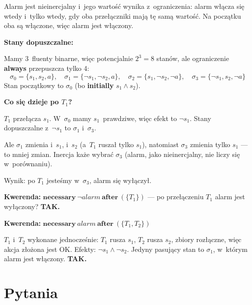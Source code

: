 \documentclass[11pt,a4paper]{article}
\newcommand{\aft}{\textbf{after}}
\newcommand{\initially}{\textbf{initially}}
\newcommand{\always}{\textbf{always}}
\newcommand{\necessary}{\textbf{necessary}}
\begin{document}
Alarm jest nieinercjalny i~jego wartość wynika z~ograniczenia: alarm włącza się
wtedy i~tylko wtedy, gdy oba przełączniki mają tę samą wartość.
Na początku oba są włączone, więc alarm jest włączony.

\medskip
\noindent\textbf{Stany dopuszczalne:}

Mamy 3~fluenty binarne, więc potencjalnie $2^3 = 8$ stanów,
ale ograniczenie \always{} przepuszcza tylko 4:
\[
  \sigma_0 = \{s_1, s_2, a\}, \quad
  \sigma_1 = \{\neg s_1, \neg s_2, a\}, \quad
  \sigma_2 = \{s_1, \neg s_2, \neg a\}, \quad
  \sigma_3 = \{\neg s_1, s_2, \neg a\}
\]
Stan początkowy to $\sigma_0$ (bo \initially{} $s_1 \land s_2$).

\medskip
\noindent\textbf{Co się dzieje po $T_1$?}

$T_1$ przełącza $s_1$. W~$\sigma_0$ mamy $s_1$~prawdziwe,
więc efekt to $\neg s_1$. Stany dopuszczalne z~$\neg s_1$ to $\sigma_1$ i~$\sigma_3$.

Ale $\sigma_1$ zmienia i~$s_1$, i~$s_2$ (a~$T_1$ ruszał tylko $s_1$),
natomiast $\sigma_3$ zmienia tylko $s_1$ --- to mniej zmian.
Inercja każe wybrać $\sigma_3$ (alarm, jako nieinercjalny, nie liczy się w~porównaniu).

Wynik: po $T_1$ jesteśmy w~$\sigma_3$, alarm się wyłączył.

\medskip
\noindent\textbf{Kwerenda:} $\necessary\ \neg\mathit{alarm}\ \aft\ (\{T_1\})$
--- po przełączeniu $T_1$ alarm jest wyłączony? \textbf{TAK.}

\medskip
\noindent\textbf{Kwerenda:} $\necessary\ \mathit{alarm}\ \aft\ (\{T_1, T_2\})$

$T_1$ i~$T_2$ wykonane jednocześnie: $T_1$ rusza $s_1$, $T_2$ rusza $s_2$,
zbiory rozłączne, więc akcja złożona jest OK. Efekty: $\neg s_1 \land \neg s_2$.
Jedyny pasujący stan to $\sigma_1$, w~którym alarm jest włączony. \textbf{TAK.}

\section{Pytania }
\end{document}
